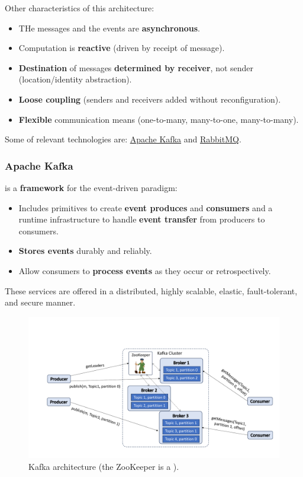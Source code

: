 \highspace
Other characteristics of this architecture:
\begin{itemize}
    \item THe messages and the events are \textbf{asynchronous}.
    
    \item Computation is \textbf{reactive} (driven by receipt of message).

    \item \textbf{Destination} of messages \textbf{determined by receiver}, not sender (location/identity abstraction).

    \item \textbf{Loose coupling} (senders and receivers added without reconfiguration).
    
    \item \textbf{Flexible} communication means (one-to-many, many-to-one, many-to-many).
\end{itemize}
Some  of relevant technologies are: \href{https://kafka.apache.org/}{Apache Kafka} and \href{https://www.rabbitmq.com/}{RabbitMQ}.

\newpage

\subsubsection{Apache Kafka}

 is a \textbf{framework} for the event-driven paradigm:
\begin{itemize}
    \item Includes primitives to create \textbf{event produces} and \textbf{consumers} and a runtime infrastructure to handle \textbf{event transfer} from producers to consumers.
    
    \item \textbf{Stores events} durably and reliably.
    
    \item Allow consumers to \textbf{process events} as they occur or retrospectively.
\end{itemize}
These services are offered in a distributed, highly scalable, elastic, fault-tolerant, and secure manner.

\begin{figure}[!htp]
    \centering
    \includegraphics[width=\textwidth]{img/kafka-arch-1.pdf}
    \caption{Kafka architecture (the ZooKeeper is a ).}
\end{figure}

